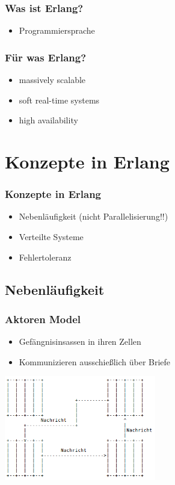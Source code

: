 \begin{frame} %
  \frametitle{Was ist Erlang?} %
  \begin{itemize} %
    \item Programmiersprache
  \end{itemize}
\end{frame}

\begin{frame} %
  \frametitle{Für was Erlang?} %
  \begin{itemize} %
    \item massively scalable
    \item soft real-time systems
    \item high availability
  \end{itemize}
\end{frame}

\section{Konzepte in Erlang}
\begin{frame} %
  \frametitle{Konzepte in Erlang} %
  \begin{itemize} %
    \item Nebenläufigkeit (nicht Parallelisierung!!)
    \item Verteilte Systeme
    \item Fehlertoleranz
  \end{itemize}
\end{frame}

\subsection{Nebenläufigkeit}
\begin{frame} %
  \frametitle{Aktoren Model} %
  \begin{itemize} %
    \item Gefängnisinsassen in ihren Zellen
    \item Kommunizieren ausschießlich über Briefe
  \end{itemize}
  \includegraphics[width=250px]{img/actoren}
\end{frame}

